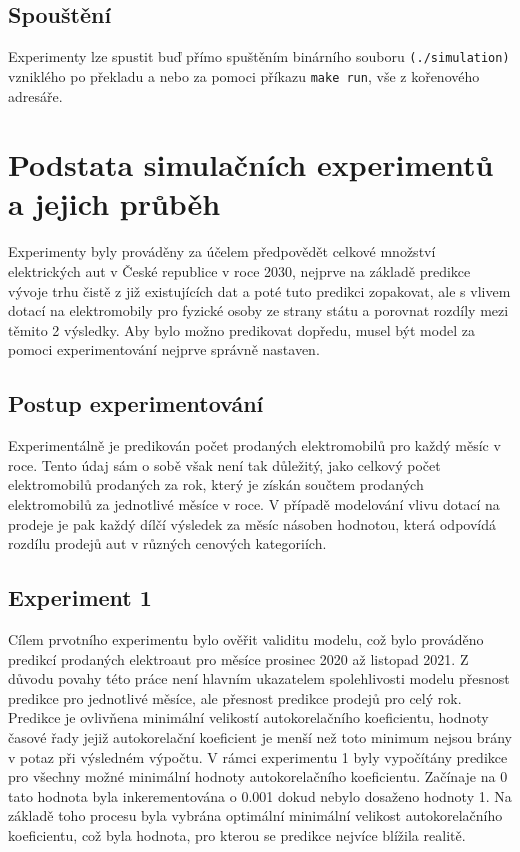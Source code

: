\documentclass[14pt]{extarticle}
\begin{document}
    \subsection{Spouštění}
    Experimenty lze spustit buď přímo spuštěním binárního souboru \texttt{(./simulation)} vzniklého po překladu a nebo za pomoci příkazu \texttt{make run}, vše z kořenového adresáře.
    
    \section{Podstata simulačních experimentů a jejich průběh}
    
    Experimenty byly prováděny za účelem předpovědět celkové množství elektrických aut v České republice v roce 2030, nejprve na základě predikce vývoje trhu čistě z již existujících dat a poté tuto predikci zopakovat, ale s vlivem dotací na elektromobily pro fyzické osoby ze strany státu a porovnat rozdíly mezi těmito 2 výsledky. Aby bylo možno predikovat dopředu, musel být model za pomoci experimentování nejprve správně nastaven.
    
    \subsection{Postup experimentování}
    Experimentálně je predikován počet prodaných elektromobilů pro každý měsíc v roce. Tento údaj sám o sobě však není tak důležitý, jako celkový počet elektromobilů prodaných za rok, který je získán součtem prodaných elektromobilů za jednotlivé měsíce v roce. V případě modelování vlivu dotací na prodeje je pak každý dílčí výsledek za měsíc násoben hodnotou, která odpovídá rozdílu prodejů aut v různých cenových kategoriích.
    
    \subsection{Experiment 1}
    \label{exp1}
    Cílem prvotního experimentu bylo ověřit validitu modelu, což bylo prováděno predikcí prodaných elektroaut pro měsíce prosinec 2020 až listopad 2021. Z důvodu povahy této práce není hlavním ukazatelem spolehlivosti modelu přesnost predikce pro jednotlivé měsíce, ale přesnost predikce prodejů pro celý rok. Predikce je ovlivňena minimální velikostí autokorelačního koeficientu, hodnoty časové řady jejiž autokorelační koeficient je menší než toto minimum nejsou brány v potaz při výsledném výpočtu. V rámci experimentu 1 byly vypočítány predikce pro všechny možné minimální hodnoty autokorelačního koeficientu. Začínaje na 0 tato hodnota byla inkerementována o 0.001 dokud nebylo dosaženo hodnoty 1. Na základě toho procesu byla vybrána optimální minimální velikost autokorelačního koeficientu, což byla hodnota, pro kterou se predikce nejvíce blížila realitě. 
    
\end{document}
